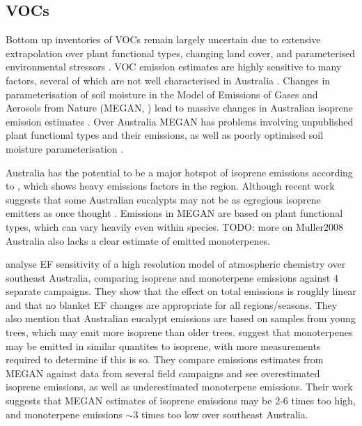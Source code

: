  \subsection{VOCs}
    Bottom up inventories of VOCs remain largely uncertain due to extensive extrapolation over plant functional types, changing land cover, and parameterised environmental stressors \citep{Guenther2000,Kanakidou2005,Millet2006}.
    VOC emission estimates are highly sensitive to many factors, several of which are not well characterised in Australia \citep{Sindelarova2014, Bauwens2016}.
    Changes in parameterisation of soil moisture in the Model of Emissions of Gases and Aerosols from Nature (MEGAN, \cite{Guenther1995}) lead to massive changes in Australian isoprene emission estimates \citep{Sindelarova2014}.
    Over Australia MEGAN has problems involving unpublished plant functional types and their emissions, as well as poorly optimised soil moisture parameterisation \citep{Emmerson2016}.
    
    Australia has the potential to be a major hotspot of isoprene emissions according to \cite{Guenther2006,Guenther2012}, which shows heavy emissions factors in the region.
    Although recent work suggests that some Australian eucalypts may not be as egregious isoprene emitters as once thought \cite{Emmerson2016}.
    Emissions in MEGAN are based on plant functional types, which can vary heavily even within species.
    TODO: more on Muller2008
    Australia also lacks a clear estimate of emitted monoterpenes.
    
    \cite{Emmerson2016} analyse EF sensitivity of a high resolution model of atmospheric chemistry over southeast Australia, comparing isoprene and monoterpene emissions against 4 separate campaigns.
    They show that the effect on total emissions is roughly linear and that no blanket EF changes are appropriate for all regions/seasons.
    They also mention that Australian eucalypt emissions are based on samples from young trees, which may emit more isoprene than older trees.
    \cite{Emmerson2016} suggest that monoterpenes may be emitted in similar quantites to isoprene, with more measurements required to determine if this is so.
    They compare emissions estimates from MEGAN against data from several field campaigns and see overestimated isoprene emissions, as well as underestimated monoterpene emissions.
    Their work suggests that MEGAN estimates of isoprene emissions may be 2-6 times too high, and monoterpene emissions $\sim3$ times too low over southeast Australia.
    
